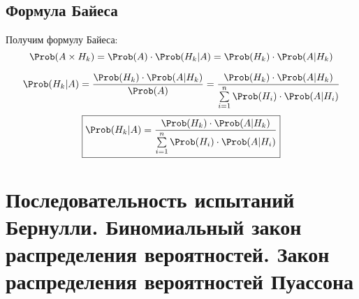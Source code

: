 \subsection{Формула Байеса}
Получим формулу Байеса:
\[ \Prob(A \times H_k) = \Prob(A) \cdot \Prob(H_k | A) = \Prob(H_k) \cdot \Prob(A | H_k) \]

\[ \Prob(H_k | A) = \frac{\Prob(H_k) \cdot \Prob(A|H_k)}{\Prob(A)} = \frac{\Prob(H_k) \cdot \Prob(A | H_k)}{\sum\limits_{i=1}^n \Prob(H_i) \cdot \Prob(A|H_i)}
\]
\[ \boxed{\Prob(H_k | A) = \frac{\Prob(H_k) \cdot \Prob(A | H_k)}{\sum\limits_{i=1}^n \Prob(H_i) \cdot \Prob(A|H_i)}} \]

\section{Последовательность испытаний Бернулли. Биномиальный закон распределения вероятностей. Закон распределения вероятностей Пуассона}
